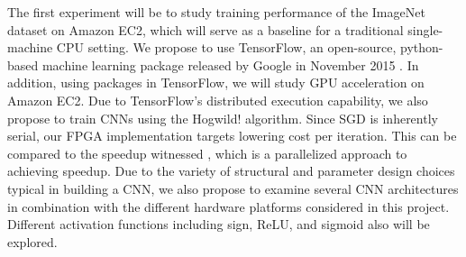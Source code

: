 The first experiment will be to study training performance of the ImageNet dataset on Amazon EC2, which will serve as a baseline for a traditional single-machine CPU setting.  We propose to use TensorFlow, an open-source, python-based machine learning package released by Google in November 2015 \cite{tensorflow}.  In addition, using packages in TensorFlow, we will study GPU acceleration on Amazon EC2.  Due to TensorFlow’s distributed execution capability, we also propose to train CNNs using the Hogwild! algorithm.  Since SGD is inherently serial, our FPGA implementation targets lowering cost per iteration.  This can be compared to the speedup witnessed {}, which is a parallelized approach to achieving speedup.  Due to the variety of structural and parameter design choices typical in building a CNN, we also propose to examine several CNN architectures in combination with the different hardware platforms considered in this project.  Different activation functions including sign, ReLU, and sigmoid also will be explored.
